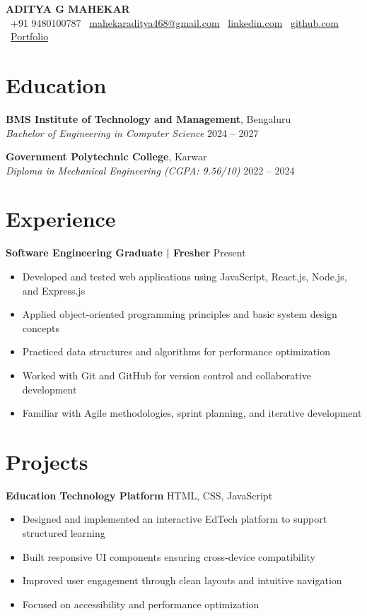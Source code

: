 \documentclass[11pt]{article}
\begin{document}
{\LARGE \textbf{ADITYA G MAHEKAR}}\\[2pt]
{\small
\faPhone\ +91 9480100787 \;\textbullet\;
\faEnvelope\ \href{mailto:mahekaraditya468@gmail.com}{mahekaraditya468@gmail.com} \;\textbullet\;
\faLinkedin\ \href{https://linkedin.com/in/adityamahekar}{linkedin.com} \;\textbullet\;
\faGithub\ \href{https://github.com/adityamahekar}{github.com} \;\textbullet\;
\faGlobe\ \href{https://adityamahekar.github.io/MyPro/}{Portfolio}
}

\section*{Education}
\textbf{BMS Institute of Technology and Management}, Bengaluru\\
\textit{Bachelor of Engineering in Computer Science} \hfill 2024 -- 2027

\vspace{6pt}

\textbf{Government Polytechnic College}, Karwar\\
\textit{Diploma in Mechanical Engineering (CGPA: 9.56/10)} \hfill 2022 -- 2024


\section*{Experience}
\textbf{Software Engineering Graduate | Fresher} \hfill Present
\begin{itemize}[leftmargin=*,noitemsep]
\item Developed and tested web applications using JavaScript, React.js, Node.js, and Express.js
\item Applied object-oriented programming principles and basic system design concepts
\item Practiced data structures and algorithms for performance optimization
\item Worked with Git and GitHub for version control and collaborative development
\item Familiar with Agile methodologies, sprint planning, and iterative development
\end{itemize}

\section*{Projects}
\textbf{Education Technology Platform} \hfill HTML, CSS, JavaScript
\begin{itemize}[leftmargin=*,noitemsep]
\item Designed and implemented an interactive EdTech platform to support structured learning
\item Built responsive UI components ensuring cross-device compatibility
\item Improved user engagement through clean layouts and intuitive navigation
\item Focused on accessibility and performance optimization
\end{itemize}
\end{document}
